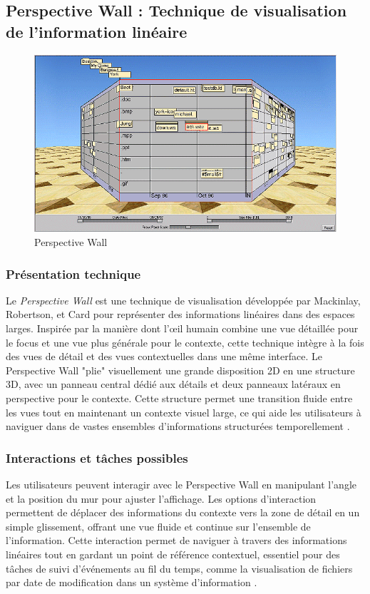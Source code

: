 \documentclass[runningheads]{llncs}
\begin{document}
\subsection{Perspective Wall : Technique de visualisation de l'information linéaire}
\begin{figure}
    \centering
    \includegraphics[width=1\linewidth]{assets/perspective-wall.png}
    \caption{Perspective Wall\cite{mackinlay_perspective_1991}}
    \label{fig:enter-label}
\end{figure}

\subsubsection{Présentation technique}
Le \textit{Perspective Wall} est une technique de visualisation développée par Mackinlay, Robertson, et Card \cite{mackinlay_perspective_1991} pour représenter des informations linéaires dans des espaces larges. Inspirée par la manière dont l'œil humain combine une vue détaillée pour le focus et une vue plus générale pour le contexte, cette technique intègre à la fois des vues de détail et des vues contextuelles dans une même interface. Le Perspective Wall "plie" visuellement une grande disposition 2D en une structure 3D, avec un panneau central dédié aux détails et deux panneaux latéraux en perspective pour le contexte. Cette structure permet une transition fluide entre les vues tout en maintenant un contexte visuel large, ce qui aide les utilisateurs à naviguer dans de vastes ensembles d'informations structurées temporellement \cite{mackinlay_perspective_1991}.

\subsubsection{Interactions et tâches possibles}
Les utilisateurs peuvent interagir avec le Perspective Wall en manipulant l’angle et la position du mur pour ajuster l'affichage. Les options d'interaction permettent de déplacer des informations du contexte vers la zone de détail en un simple glissement, offrant une vue fluide et continue sur l'ensemble de l'information. Cette interaction permet de naviguer à travers des informations linéaires tout en gardant un point de référence contextuel, essentiel pour des tâches de suivi d'événements au fil du temps, comme la visualisation de fichiers par date de modification dans un système d’information \cite{mackinlay_perspective_1991}.
\end{document}
